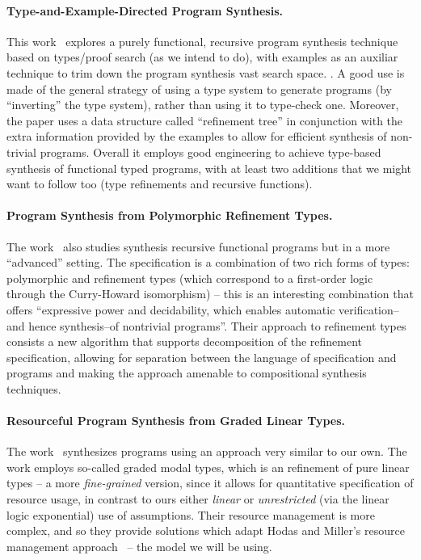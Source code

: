 \documentclass{llncs}
\newcommand{\mypara}[1]{\paragraph{\textbf{#1}.}}
\begin{document}
\mypara{Type-and-Example-Directed Program Synthesis} This
work~\cite{DBLP:conf/pldi/OseraZ15,DBLP:conf/popl/FrankleOWZ16}
explores a purely functional, recursive program synthesis technique
based on types/proof search (as we intend to do), with examples as an
auxiliar technique to trim down the program synthesis vast search
space.  .  A good use is
made of the general strategy of using a type system to generate
programs (by ``inverting'' the type system), rather than using it to
type-check one.  Moreover, the paper uses a data structure called
``refinement tree'' in conjunction with the extra information provided
by the examples to allow for efficient synthesis of non-trivial
programs. Overall it employs good engineering to achieve type-based
synthesis of functional typed programs, with at least two additions
that we might want to follow too (type refinements and recursive
functions).

  
\mypara{Program Synthesis from Polymorphic Refinement Types} The
work~\cite{DBLP:conf/pldi/PolikarpovaKS16} also studies synthesis
recursive functional programs but in a more ``advanced'' setting. The
specification is a combination of two rich forms of types: polymorphic and
refinement types (which correspond to a first-order logic through the
Curry-Howard isomorphism) -- this is an interesting combination that offers
``expressive power and decidability, which enables automatic
verification--and hence synthesis--of nontrivial programs''.  Their
approach to refinement types consists a new algorithm that supports
decomposition of the refinement specification, allowing for separation
between the language of specification and programs and making the
approach amenable to compositional synthesis techniques.

\mypara{Resourceful Program Synthesis from Graded Linear Types} The
work~\cite{DBLP:conf/lopstr/HughesO20} synthesizes programs using an
approach very similar to our own.  The work employs so-called graded
modal types, which is an refinement of pure linear types -- a more
\emph{fine-grained} version, since it allows for quantitative
specification of resource usage, in contrast to ours either
\emph{linear} or \emph{unrestricted} (via the linear logic
exponential) use of assumptions.  Their resource management is more
complex, and so they provide solutions which adapt Hodas and Miller's
resource management
approach~\cite{DBLP:journals/tcs/CervesatoHP00,DBLP:journals/tcs/LiangM09}
-- the model we will be using.
\end{document}
